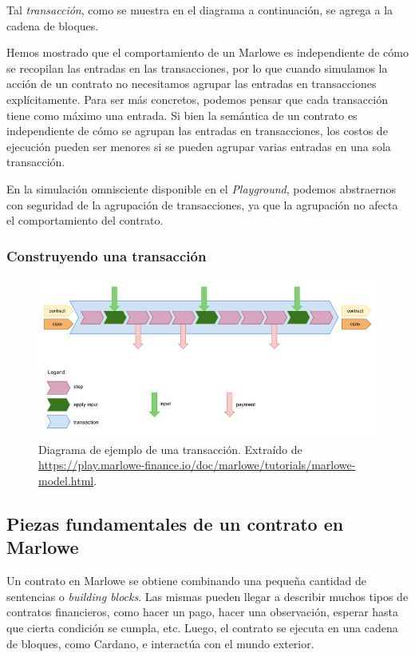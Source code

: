 \documentclass[12pt]{book}
\begin{document}
Tal \textit{transacción}, como se muestra en el diagrama a continuación, se agrega a la cadena de bloques. 

Hemos mostrado que el comportamiento de un Marlowe es independiente de cómo se recopilan las entradas en las transacciones, por lo que cuando simulamos la acción de un contrato no necesitamos agrupar las entradas en transacciones explícitamente. Para ser más concretos, podemos pensar que cada transacción tiene como máximo una entrada. Si bien la semántica de un contrato es independiente de cómo se agrupan las entradas en transacciones, los costos de ejecución pueden ser menores si se pueden agrupar varias entradas en una sola transacción.

En la simulación omnisciente disponible en el \textit{Playground}, podemos abstraernos con seguridad de la agrupación de transacciones, ya que la agrupación no afecta el comportamiento del contrato.

\subsubsection{Construyendo una transacción}

\begin{figure}[H]
    \centering
    \includegraphics[width=\textwidth]{Transaccion.png}
    \caption[Diagrama de ejemplo de una transacción.]{Diagrama de ejemplo de una transacción. Extraído de \url{https://play.marlowe-finance.io/doc/marlowe/tutorials/marlowe-model.html}.}\label{fig:Transaccion}
\end{figure}


\subsection{Piezas fundamentales de un contrato en Marlowe}\label{ssec:constructores_marlowe}
Un contrato en Marlowe se obtiene combinando una pequeña cantidad de sentencias o \textit{building blocks}. Las mismas pueden llegar a describir muchos tipos de contratos financieros, como hacer un pago, hacer una observación, esperar hasta que cierta condición se cumpla, etc. Luego, el contrato se ejecuta en una cadena de bloques, como Cardano, e interactúa con el mundo exterior.
\end{document}
